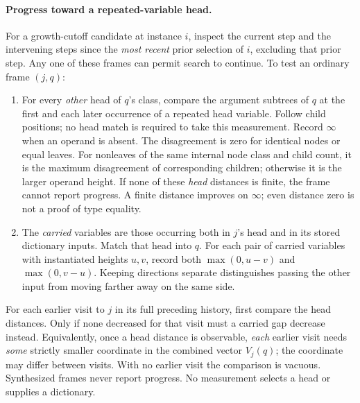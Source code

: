 \documentclass[11pt]{article}
\theoremstyle{definition}
\begin{document}
\paragraph{Progress toward a repeated-variable head.}
For a growth-cutoff candidate at instance $i$, inspect the current step
and the intervening steps since the \emph{most recent} prior selection
of $i$, excluding that prior step. Any one of these frames can permit
search to continue. To test an ordinary frame $(j,q)$:
\begin{enumerate}
\item For every \emph{other} head of $q$'s class, compare the argument
      subtrees of $q$ at the first and each later occurrence of a repeated
      head variable. Follow child positions; no head match is required
      to take this measurement. Record $\infty$ when an operand is absent.
      The disagreement is zero for identical nodes or equal leaves. For
      nonleaves of the same internal node class and child count, it is the
      maximum disagreement of corresponding children; otherwise it is the
      larger operand height. If none of these \emph{head} distances is
      finite, the frame cannot report progress. A finite distance improves
      on $\infty$; even distance zero is not a proof of type equality.
\item The \emph{carried} variables are those occurring both in $j$'s
      head and in its stored dictionary inputs. Match that head into $q$.
      For each pair of carried variables with instantiated heights $u,v$,
      record both $\max(0,u-v)$ and $\max(0,v-u)$. Keeping directions
      separate distinguishes passing the other input from moving farther
      away on the same side.
\end{enumerate}
For each earlier visit to $j$ in its full preceding history, first compare
the head distances. Only if none decreased for that visit must a carried
gap decrease instead. Equivalently, once a head distance is observable,
\emph{each} earlier visit needs \emph{some} strictly smaller coordinate
in the combined vector $V_j(q)$; the coordinate may differ between
visits. With no earlier visit the comparison is vacuous. Synthesized
frames never report progress. No measurement selects a head or supplies
a dictionary.
\end{document}

